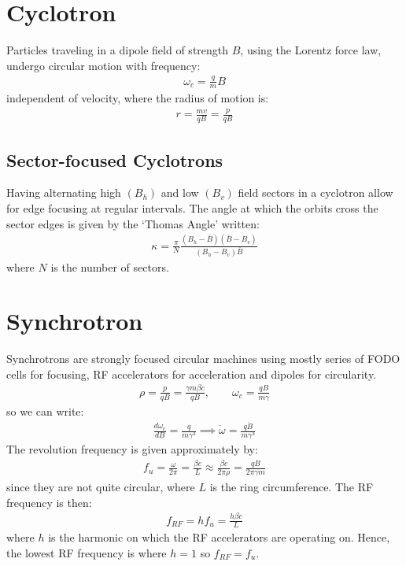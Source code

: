 \documentclass{article}
\numberwithin{equation}{section}
\begin{document}
\section{Cyclotron}

Particles traveling in a dipole field of strength $B$, using the Lorentz force law, undergo circular motion with frequency:
\begin{align}
\omega_c = \frac{q}{m}B
\end{align}
independent of velocity, where the radius of motion is:
\begin{align}
r = \frac{mv}{qB} = \frac{p}{qB}
\end{align}

\subsection{Sector-focused Cyclotrons}
Having alternating high $(B_h)$ and low $(B_v)$ field sectors in a cyclotron allow for edge focusing at regular intervals. The angle at which the orbits cross the sector edges is given by the `Thomas Angle' written:
\begin{align}
\kappa = \frac{\pi}{N} \frac{(B_h-\bar{B})(\bar{B}-B_v)}{(B_h-B_v)\bar{B}}
\end{align}
where $N$ is the number of sectors.

\section{Synchrotron}
Synchrotrons are strongly focused circular machines using mostly series of FODO cells for focusing, RF accelerators for acceleration and dipoles for circularity. 
\begin{align}
\rho = \frac{p}{qB} = \frac{\gamma m \beta c}{qB},\qquad \omega_c = \frac{qB}{m\gamma}
\end{align}
so we can write:
\begin{align}
\frac{d \omega_c}{dB} = \frac{q}{m \gamma^3} \implies \dot{\omega} = \frac{q \dot{B}}{m \gamma^3}
\end{align}
The revolution frequency is given approximately by:
\begin{align}
f_u = \frac{\omega}{2 \pi} = \frac{\beta c}{L} \approx \frac{\beta c}{2 \pi \rho} = \frac{qB}{2\pi \gamma m}
\end{align}
since they are not quite circular, where $L$ is the ring circumference. The RF frequency is then:
\begin{align}
f_{RF} = h f_u = \frac{h \beta c}{L}
\end{align}
where $h$ is the harmonic on which the RF accelerators are operating on. Hence, the lowest RF frequency is where $h=1$ so $f_{RF} = f_u$.
\end{document}
